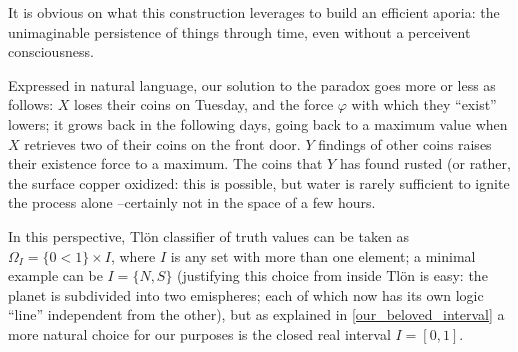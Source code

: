 \begin{example}
	It is obvious on what this construction leverages to build an efficient aporia: the unimaginable persistence of things through time, even without a perceivent consciousness.

	Expressed in natural language, our solution to the paradox goes more or less as follows: $X$ loses their coins on Tuesday, and the force $\varphi$ with which they ``exist'' lowers; it grows back in the following days, going back to a maximum value when $X$ retrieves two of their coins on the front door. $Y$ findings of other coins raises their existence force to a maximum. The coins that $Y$ has found rusted (or rather, the surface copper oxidized: this is possible, but water is rarely sufficient to ignite the process alone --certainly not in the space of a few hours.
	\begin{remark}\label{our_beloved_interval}
		In this perspective, Tl\"on classifier of truth values can be taken as $\Omega_I = \{0<1\}\times I$, where $I$ is any set with more than one element; a minimal example can be $I=\{N,S\}$ (justifying this choice from inside Tl\"on is easy: the planet is subdivided into two emispheres; each of which now has its own logic ``line'' independent from the other), but as explained in \autoref{our_beloved_interval} a more natural choice for our purposes is the closed real interval $I=[0,1]$.


\end{remark}
\end{example}
